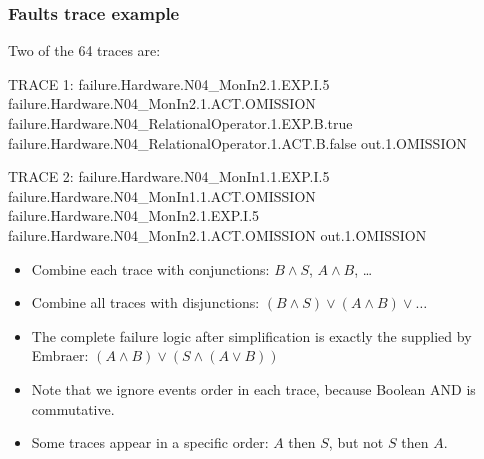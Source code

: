 \begin{frame}[fragile]
\frametitle{Faults trace example}
Two of the 64 traces are:
\begin{snippetcspm}[0]
TRACE 1:
failure.Hardware.N04_MonIn2.1.EXP.I.5
failure.Hardware.N04_MonIn2.1.ACT.OMISSION
failure.Hardware.N04_RelationalOperator.1.EXP.B.true
failure.Hardware.N04_RelationalOperator.1.ACT.B.false
out.1.OMISSION

TRACE 2:
failure.Hardware.N04_MonIn1.1.EXP.I.5
failure.Hardware.N04_MonIn1.1.ACT.OMISSION
failure.Hardware.N04_MonIn2.1.EXP.I.5
failure.Hardware.N04_MonIn2.1.ACT.OMISSION
out.1.OMISSION
\end{snippetcspm}
\footnotesize
\begin{itemize}
  \item Combine each trace with conjunctions: $B \land S$, $A \land B$, \ldots
  \item Combine all traces with disjunctions: $(B \land S) \lor (A \land B) \lor \ldots$
  \item The complete failure logic after simplification is exactly the supplied by Embraer: \alert<4>{$(A \land B) \lor (S \land (A \lor B))$}
  \item <2-> Note that we ignore events order in each trace, because Boolean AND is commutative.
  \item<3-> Some traces appear in a specific order: $A$ then $S$, but not $S$ then $A$.
\end{itemize}

\end{frame}